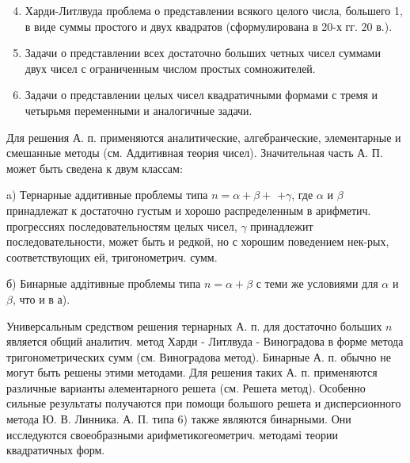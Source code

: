 \documentclass[10pt]{article}
\begin{document}
\begin{enumerate}

  \setcounter{enumi}{3}

  \item Харди-Литлвуда проблема о представлении всякого целого числа, большего 1, в виде суммы простого и двух квадратов (сформулирована в 20-х гг. 20 в.).



  \item Задачи о представлении всех достаточно больших четных чисел суммами двух чисел с ограниченным числом простых сомножителей.



  \item Задачи о представлении целых чисел квадратичными формами с тремя и четырьмя переменными и аналогичные задачи.



\end{enumerate}



Для решения А. п. применяются аналитические, алгебраические, элементарные и смешанные методы (см. Аддитивная теория чисел). Значительная часть А. П. может быть сведена к двум классам:



a) Тернарные аддитивные проблемы типа $n=\alpha+\beta+$ $+\gamma$, где $\alpha$ и $\beta$ принадлежат к достаточно густым и хорошо распределенным в арифметич. прогрессиях последовательностям целых чисел, $\gamma$ принадлежит последовательности, может быть и редкой, но с хорошим поведением нек-рых, соответствующих ей, тригонометрич. сумм.



б) Бинарные аддітивные проблемы типа $n=\alpha+\beta$ с теми же условиями для $\alpha$ и $\beta$, что и в а).



Универсальным средством решения тернарных А. п. для достаточно больших $n$ является общий аналитич. метод Харди - Литлвуда - Виноградова в форме метода тригонометрических сумм (см. Виноградова метод). Бинарные А. п. обычно не могут быть решены этими методами. Для решения таких А. п. применяются различные варианты әлементарного решета (см. Решета метод). Особенно сильные результаты получаются при помощи большого решета и дисперсионного метода Ю. В. Линника. А. П. типа 6) также являются бинарными. Они исследуются своеобразными арифметикогеометрич. методамі теории квадратичных форм.
\end{document}
